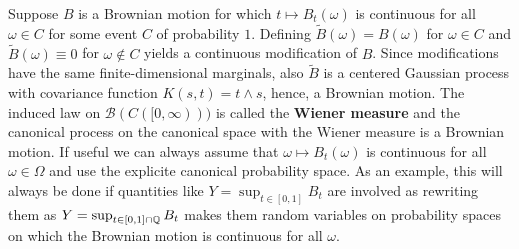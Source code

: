 Suppose $B$ is a Brownian motion for which $t\mapsto B_t(\omega)$ is continuous for all $\omega\in C$ for some event $C$ of probability $1$. Defining $\tilde B(\omega)=B(\omega)$ for $\omega \in C$ and $\tilde B(\omega)\equiv 0$ for $\omega\notin C$ yields a continuous modification of $B$. Since modifications have the same finite-dimensional marginals, also $\tilde B$ is a centered Gaussian process with covariance function $K(s,t)=t\wedge s$, hence, a Brownian motion. The induced law on $\mathcal B(C([0,\infty)))$ is called the \textbf{Wiener measure} and the canonical process on the canonical space with the Wiener measure is a Brownian motion. If useful we can always assume that $\omega\mapsto B_t(\omega)$ is continuous for all $\omega\in \Omega$ and use the  explicite canonical probability space. As an example, this will always be done if quantities like $Y=\sup_{t\in [0,1]}B_t$ are involved as rewriting them as $Y=\sup_{t\in[0,1]\cap \mathbb{Q}} B_t$ makes them random variables on probability spaces on which the Brownian motion is continuous for all $\omega$.\smallskip

